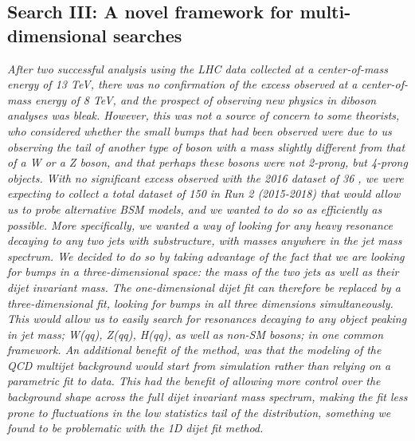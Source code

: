 \vspace*{\fill}
\begin{centering}
\chapter{Search III: A novel framework for multi-dimensional searches}
\label{searchIII}
\textit{
\noindent After two successful analysis using the LHC data collected at a center-of-mass energy of 13 TeV, there was no confirmation of the excess observed at a center-of-mass energy of 8 TeV, and the prospect of observing new physics in diboson analyses was bleak. However, this was not a source of concern to some theorists, who considered whether the small bumps that had been observed were due to us observing the tail of another type of boson with a mass slightly different from that of a W or a Z boson, and that perhaps these bosons were not 2-prong, but 4-prong objects.
\newline
\newline
With no significant excess observed with the 2016 dataset of 36 \fbinv, we were expecting to collect a total dataset of 150 \fbinv in Run 2 (2015-2018) that would allow us to probe alternative BSM models, and we wanted to do so as efficiently as possible. More specifically, we wanted a way of looking for any heavy resonance decaying to any two jets with substructure, with masses anywhere in the jet mass spectrum. We decided to do so by taking advantage of the fact that we are looking for bumps in a three-dimensional space: the mass of the two jets as well as their dijet invariant mass. The one-dimensional dijet fit can therefore be replaced by a three-dimensional fit, looking for bumps in all three dimensions simultaneously. This would allow us to easily search for resonances decaying to any object peaking in jet mass; W(qq), Z(qq), H(qq), as well as non-SM bosons; in one common framework.
\newline
\newline
An additional benefit of the method, was that the modeling of the QCD multijet background would start from simulation rather than relying on a parametric fit to data. This had the benefit of allowing more control over the background shape across the full dijet invariant mass spectrum, making the fit less prone to fluctuations in the low statistics tail of the distribution, something we found to be problematic with the 1D dijet fit method.
\newline
}
\end{centering}
